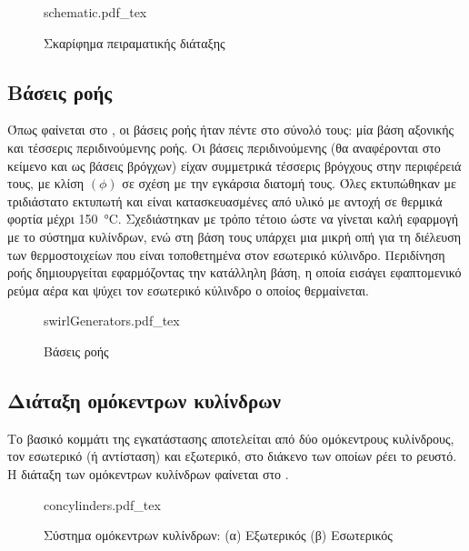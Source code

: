 \clearpage

\begin{figure}[tbp]
\centering
{schematic.pdf_tex}
\caption{Σκαρίφημα πειραματικής διάταξης}\label{fig:schematic}
\end{figure}

\subsection{Βάσεις ροής}

\noindent Όπως φαίνεται στο , οι βάσεις ροής ήταν πέντε στο σύνολό τους: μία βάση αξονικής και τέσσερις περιδινούμενης ροής. Οι βάσεις περιδινούμενης (θα αναφέρονται στο κείμενο και ως βάσεις βρόγχων) είχαν συμμετρικά τέσσερις βρόγχους στην περιφέρειά τους, με κλίση $\left(\phi\right)$ σε σχέση με την εγκάρσια διατομή τους. Όλες εκτυπώθηκαν με τριδιάστατο εκτυπωτή και είναι κατασκευασμένες από υλικό με αντοχή σε θερμικά φορτία μέχρι \qty{150}{\degreeCelsius}. Σχεδιάστηκαν με τρόπο τέτοιο ώστε να γίνεται καλή εφαρμογή με το σύστημα κυλίνδρων, ενώ στη βάση τους υπάρχει μια μικρή οπή για τη διέλευση των θερμοστοιχείων που είναι τοποθετημένα στον εσωτερικό κύλινδρο. Περιδίνηση ροής δημιουργείται εφαρμόζοντας την κατάλληλη βάση, η οποία εισάγει εφαπτομενικό ρεύμα αέρα και ψύχει τον εσωτερικό κύλινδρο ο οποίος θερμαίνεται.

\clearpage

\begin{figure}[tbp]
\centering
{swirlGenerators.pdf_tex}
\caption{Βάσεις ροής}\label{fig:swirlgenerators}
\end{figure}

\subsection{Διάταξη ομόκεντρων κυλίνδρων}

\noindent Το βασικό κομμάτι της εγκατάστασης αποτελείται από δύο ομόκεντρους κυλίνδρους, τον εσωτερικό (ή αντίσταση) και εξωτερικό, στο διάκενο των οποίων ρέει το ρευστό. Η διάταξη των ομόκεντρων κυλίνδρων φαίνεται στο .


\begin{figure}[htbp]
\centering
{concylinders.pdf_tex}
\caption{Σύστημα ομόκεντρων κυλίνδρων: (α) Εξωτερικός (β) Εσωτερικός}\label{fig:concylinders}
\end{figure}
	
